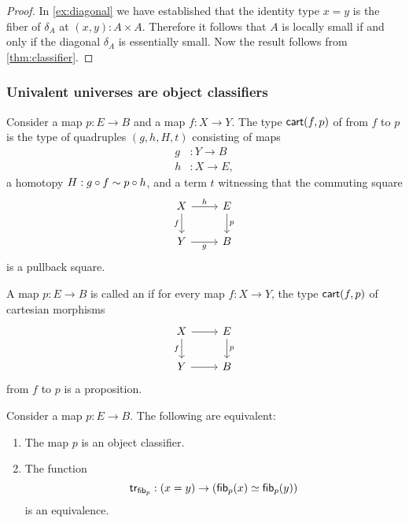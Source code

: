 \begin{proof}
In \cref{ex:diagonal} we have established that the identity type $x=y$ is the fiber of $\delta_A$ at $(x,y):A\times A$. Therefore it follows that $A$ is locally small if and only if the diagonal $\delta_A$ is essentially small.
Now the result follows from \cref{thm:classifier}.
\end{proof}

\subsubsection{Univalent universes are object classifiers}

\begin{defn}
  Consider a map $p:E\to B$ and a map $f:X\to Y$. The type $\mathsf{cart}(f,p)$ of  from $f$ to $p$ is the type of quadruples $(g,h,H,t)$ consisting of maps
  \begin{align*}
    g & : Y\to B \\
    h & : X\to E,
  \end{align*}
  a homotopy $H:g\circ f\sim p\circ h$, and a term $t$ witnessing that the commuting square
  \begin{equation*}
    \begin{tikzcd}
      X \arrow[r,"h"] \arrow[d,swap,"f"] & E \arrow[d,"p"] \\
      Y \arrow[r,swap,"g"] & B
    \end{tikzcd}
  \end{equation*}
  is a pullback square.
\end{defn}

\begin{defn}
  A map $p:E\to B$ is called an  if for every map $f:X\to Y$, the type $\mathsf{cart}(f,p)$ of cartesian morphisms
  \begin{equation*}
    \begin{tikzcd}
      X \arrow[r] \arrow[d,swap,"f"] & E \arrow[d,"p"] \\
      Y \arrow[r] & B
    \end{tikzcd}
  \end{equation*}
  from $f$ to $p$ is a proposition. 
\end{defn}

\begin{prp}
  Consider a map $p:E\to B$. The following are equivalent:
  \begin{enumerate}
  \item The map $p$ is an object classifier.
  \item The function
    \begin{equation*}
      \mathsf{tr}_{\mathsf{fib}_{p}}:(x=y)\to (\mathsf{fib}_{p}(x)\simeq\mathsf{fib}_{p}(y))
    \end{equation*}
    is an equivalence.
  \end{enumerate}
\end{prp}

